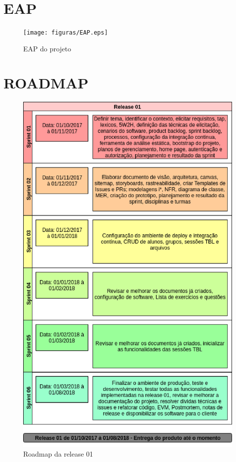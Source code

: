 \begin{apendicesenv}

\partapendices

\chapter{EAP} \label{apendice:eap}

\begin{figure}[h!]
	\centering
  \texttt{[image: figuras/EAP.eps]}
  \caption{EAP do projeto}
	\label{fig:eap}
\end{figure}

\chapter{ROADMAP} \label{apendice:roadmap}

\begin{figure}[h!]
	\centering
  \includegraphics[keepaspectratio=true,scale=0.8]{figuras/roadmap.eps}
  \caption{Roadmap da release 01}
	\label{fig:roadmap1}
\end{figure}


\end{apendicesenv}
